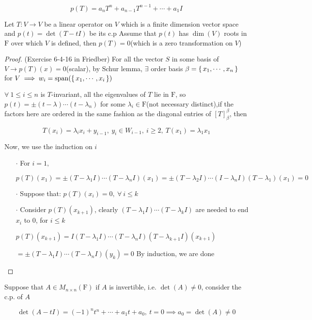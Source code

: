 $$p(T) = a_nT^n + a_{n-1}T^{n-1}+\cdots + a_1I$$

\begin{thm*}
	Let $T:V \rightarrow V$ be a linear operator on $V$ which is a finite dimension vector space and $p(t)=\det(T - tI)$ be its c.p
	Assume that $p(t)$ has $\dim(V)$ roots in $\mathrm F$ over which $V$ is defined, then $p(T) = 0$(which is a zero transformation on $V$)
\end{thm*}

\begin{proof}(Exercise 6-4-16 in Friedber)
	For all the vector $S$ in some basis of $V \rightarrow p(T)(x) = 0$(scalar), by Schur lemma, $\exists$ order basis $\beta = \left\{ \,x_1,\cdots,x_n \,\right\}$ for $V \implies w_i = \text{span($\left\{ \,x_1,\cdots,x_i \,\right\}$)} $
	
	$\forall ~1 \leq i \leq n $ is $T$-invariant, all the eigenvalues of $T$ lie in $\mathrm F$, so $p(t) = \pm (t - \lambda)\cdots(t-\lambda_n)$ for some $\lambda_i \in \mathrm F$(not necessary distinct),if the factors here are ordered in the same fashion as the diagonal entries of $[T]^{\beta}_{\beta}$, then
	
	$$T(x_i) = \lambda_ix_i+y_{i-1},~y_i \in W_{i-1},~i \geq 2,~T(x_1) = \lambda_1x_1$$
	
	Now, we use the induction on $i$
	
	\begin{enumerate}
		\item[$\cdot$] For $i = 1,$
		
		$p(T)(x_1) = \pm(T - \lambda_1 I)\cdots(T - \lambda_n I)(x_1) = \pm(T- \lambda_2 I)\cdots(I-\lambda_n I)(T - \lambda_1)(x_1) = 0$
		\item[$\cdot$] Suppose that: $p(T)(x_i)=0,~\forall~i \leq k$
		
		\item[$\cdot$] Consider $p(T)(x_{k+1})$, clearly $(T - \lambda_1 I)\cdots(T - \lambda_k I)$ are needed to end $x_i$ to $0$, for $i \leq k$
		
		$p(T)(x_{k+1}) = I(T - \lambda_1 I)\cdots(T - \lambda_n I)(T - \lambda_{k+1}I)(x_{k+1}) $
		
		$= \pm (T - \lambda_1 I)\cdots(T - \lambda_n I)(y_k) = 0$ By induction, we are done
	\end{enumerate}
\end{proof}

Suppose that $A \in M_{n \times n}(\mathrm F)$ if $A$ is invertible, i.e. $\det(A) \neq 0$, consider the c.p. of $A$

$$\det(A - tI) = (-1)^nt^n + \cdots + a_1t + a_0,~t=0 \implies a_0 = \det(A) \neq 0$$

